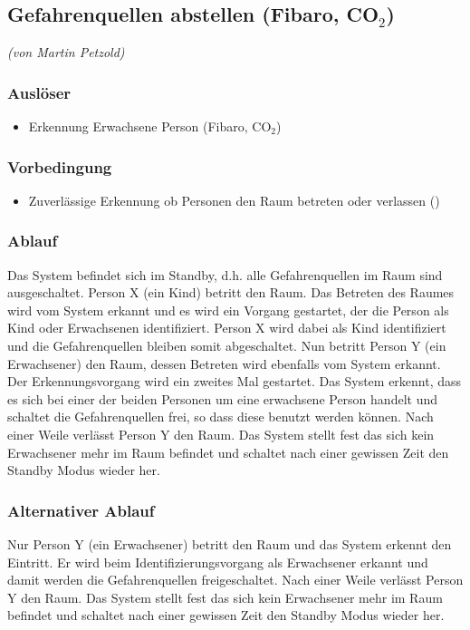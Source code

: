 \subsection{Gefahrenquellen abstellen (Fibaro, CO$_2$)}
\label{subsec:szenarioGefahrenquellen}
\emph{(von Martin Petzold)}
\subsubsection{Auslöser}
\begin{itemize}
	\item Erkennung Erwachsene Person (Fibaro, CO$_2$)
\end{itemize}

\subsubsection{Vorbedingung}
\begin{itemize}
	\item Zuverlässige Erkennung ob Personen den Raum betreten oder verlassen ()
\end{itemize}

\subsubsection{Ablauf}
Das System befindet sich im Standby, d.h. alle Gefahrenquellen im Raum sind ausgeschaltet. Person X (ein Kind) betritt den Raum. Das Betreten des Raumes wird vom System erkannt und es wird ein Vorgang gestartet, der die Person als Kind oder Erwachsenen identifiziert. Person X wird dabei als Kind identifiziert und die Gefahrenquellen bleiben somit abgeschaltet. 
Nun betritt Person Y (ein Erwachsener) den Raum, dessen Betreten wird ebenfalls vom System erkannt. Der Erkennungsvorgang wird ein zweites Mal gestartet. Das System erkennt, dass es sich bei einer der beiden Personen um eine erwachsene Person handelt und schaltet die Gefahrenquellen frei, so dass diese benutzt werden können.
Nach einer Weile verlässt Person Y den Raum. Das System stellt fest das sich kein Erwachsener mehr im Raum befindet und schaltet nach einer gewissen Zeit den Standby Modus wieder her.

\subsubsection{Alternativer Ablauf}
Nur Person Y (ein Erwachsener) betritt den Raum und das System erkennt den Eintritt. Er wird beim Identifizierungsvorgang als Erwachsener erkannt und damit werden die Gefahrenquellen freigeschaltet.
Nach einer Weile verlässt Person Y den Raum. Das System stellt fest das sich kein Erwachsener mehr im Raum befindet und schaltet nach einer gewissen Zeit den Standby Modus wieder her.

